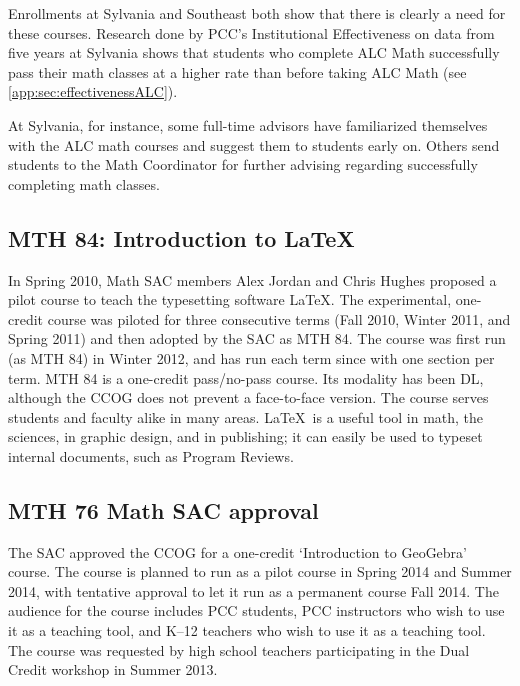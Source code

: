 Enrollments at Sylvania and Southeast both show that there is clearly a need for
these courses.  Research done by PCC's Institutional Effectiveness on data from
five years at Sylvania shows that students who complete ALC Math successfully
pass their math classes at a higher rate than before taking ALC Math  (see
\vref{app:sec:effectivenessALC}).  


At Sylvania, for instance, some full-time advisors have familiarized themselves with the ALC math courses and
suggest them to students early on.  Others send students to the Math Coordinator for
further advising regarding successfully completing math classes.
 
\subsection{MTH 84: Introduction to \LaTeX}\label{other:sec:mth84}
In Spring 2010, Math SAC members Alex Jordan and Chris Hughes proposed a pilot
course to teach the typesetting software \LaTeX.  The experimental, one-credit course was piloted for
three consecutive terms (Fall 2010, Winter 2011, and Spring 2011) and then
adopted by the SAC as MTH 84.  The course was first run (as MTH 84) in Winter
2012, and has run each term since with one section per term. MTH 84 is a one-credit 
pass/no-pass course. Its modality has been DL, although the CCOG does not
prevent a face-to-face version.  The course serves students and faculty alike in many areas.
\LaTeX\ is a useful tool in math, the sciences, in graphic design, and in
publishing; it can easily be used to typeset internal documents, such as Program Reviews.
 
\subsection{MTH 76 Math SAC approval}
The SAC approved the CCOG for a one-credit `Introduction to GeoGebra' course. The course is
planned to run as a pilot course in Spring 2014 and Summer 2014, with tentative
approval to let it run as a permanent course Fall 2014.  The audience for the
course includes PCC students, PCC instructors who wish to use it as a teaching
tool, and K--12 teachers who wish to use it as a teaching tool.  The course was
requested by high school teachers participating in the Dual Credit workshop in Summer 2013.

